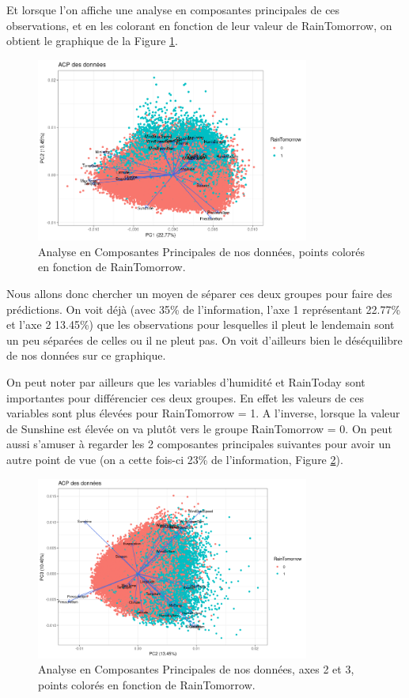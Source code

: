 \documentclass{article}
\begin{document}
Et lorsque l'on affiche une analyse en composantes principales de ces observations, et en les colorant en fonction de leur valeur de RainTomorrow, on obtient le graphique de la Figure \ref{fig:pca_raintomorrow}.

\begin{figure}[htp]
    \centering
    \includegraphics[width=0.8\textwidth]{Images/pca.png}
    \caption{Analyse en Composantes Principales de nos données, points colorés en fonction de RainTomorrow.}
    \label{fig:pca_raintomorrow}
\end{figure}

Nous allons donc chercher un moyen de séparer ces deux groupes pour faire des prédictions. On voit déjà (avec 35\% de l'information, l'axe 1 représentant 22.77\% et l'axe 2 13.45\%) que les observations pour lesquelles il pleut le lendemain sont un peu séparées de celles ou il ne pleut pas. On voit d'ailleurs bien le déséquilibre de nos données sur ce graphique.

On peut noter par ailleurs que les variables d'humidité et RainToday sont importantes pour différencier ces deux groupes. En effet les valeurs de ces variables sont plus élevées pour RainTomorrow = 1. A l'inverse, lorsque la valeur de Sunshine est élevée on va plutôt vers le groupe RainTomorrow = 0. On peut aussi s'amuser à regarder les 2 composantes principales suivantes pour avoir un autre point de vue (on a cette fois-ci 23\% de l'information, Figure \ref{fig:pca_raintomorrow2}).

\begin{figure}[htp]
    \centering
    \includegraphics[width=0.8\textwidth]{Images/pca2.png}
    \caption{Analyse en Composantes Principales de nos données, axes 2 et 3, points colorés en fonction de RainTomorrow.}
    \label{fig:pca_raintomorrow2}
\end{figure}
\end{document}
